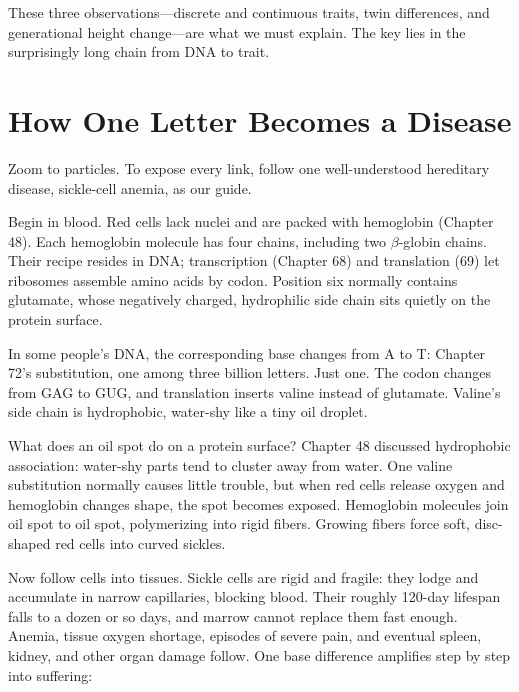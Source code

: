These three observations---discrete and continuous traits, twin differences, and generational height change---are what we must explain. The key lies in the surprisingly long chain from DNA to trait.

\section{How One Letter Becomes a Disease}

Zoom to particles. To expose every link, follow one well-understood hereditary disease, sickle-cell anemia, as our guide.

Begin in blood. Red cells lack nuclei and are packed with hemoglobin (Chapter 48). Each hemoglobin molecule has four chains, including two $\beta$-globin chains. Their recipe resides in DNA; transcription (Chapter 68) and translation (69) let ribosomes assemble amino acids by codon. Position six normally contains glutamate, whose negatively charged, hydrophilic side chain sits quietly on the protein surface.

In some people's DNA, the corresponding base changes from A to T: Chapter 72's substitution, one among three billion letters. Just one. The codon changes from GAG to GUG, and translation inserts valine instead of glutamate. Valine's side chain is hydrophobic, water-shy like a tiny oil droplet.

What does an oil spot do on a protein surface? Chapter 48 discussed hydrophobic association: water-shy parts tend to cluster away from water. One valine substitution normally causes little trouble, but when red cells release oxygen and hemoglobin changes shape, the spot becomes exposed. Hemoglobin molecules join oil spot to oil spot, polymerizing into rigid fibers. Growing fibers force soft, disc-shaped red cells into curved sickles.

Now follow cells into tissues. Sickle cells are rigid and fragile: they lodge and accumulate in narrow capillaries, blocking blood. Their roughly 120-day lifespan falls to a dozen or so days, and marrow cannot replace them fast enough. Anemia, tissue oxygen shortage, episodes of severe pain, and eventual spleen, kidney, and other organ damage follow. One base difference amplifies step by step into suffering:

\begin{center}
\end{center}

